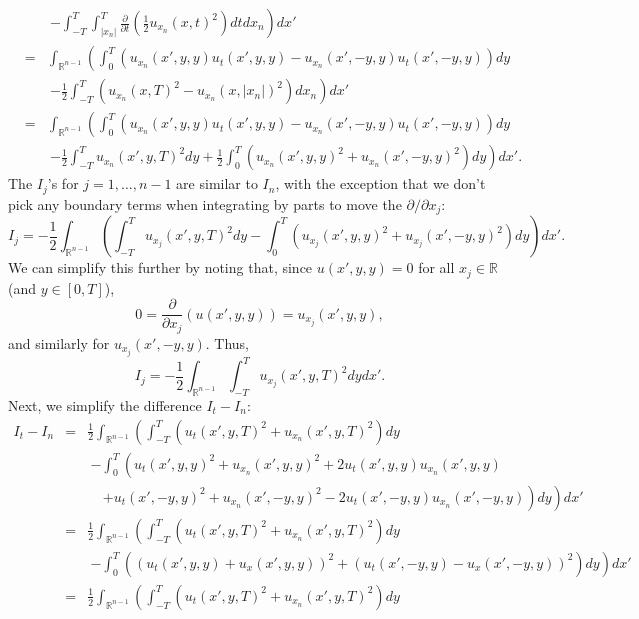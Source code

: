 \documentclass{article}
\begin{document}
\begin{enumerate}
\begin{eqnarray*}
&   & \ \left. - \int_{-T}^T \int_{|x_n|}^T \frac{\partial}{\partial t} \left( \frac{1}{2} u_{x_n}(x,t)^2 \right) dt dx_n \right) dx' \\
& = & \int_{\mathbb{R}^{n - 1}} \left( \int_0^T \left( u_{x_n}(x',y,y) u_t(x',y,y) - u_{x_n}(x',-y,y) u_t(x',-y,y) \right) dy \right. \\
&   & \ \left. - \frac{1}{2} \int_{-T}^T \left( u_{x_n}(x,T)^2 - u_{x_n}(x,|x_n|)^2 \right) dx_n \right) dx' \\
& = & \int_{\mathbb{R}^{n - 1}} \left( \int_0^T \left( u_{x_n}(x',y,y) u_t(x',y,y) - u_{x_n}(x',-y,y) u_t(x',-y,y) \right) dy \right. \\
&   & \ \left. - \frac{1}{2} \int_{-T}^T u_{x_n}(x',y,T)^2 dy + \frac{1}{2} \int_0^T \left( u_{x_n}(x',y,y)^2 + u_{x_n}(x',-y,y)^2 \right) dy \right) dx'.
\end{eqnarray*}
The \(I_j\)'s for \(j = 1, \ldots, n - 1\) are similar to \(I_n\), with the exception that we don't pick any boundary terms when integrating by parts to move the \(\partial / \partial x_j\):
\[I_j = -\frac{1}{2} \int_{\mathbb{R}^{n - 1}} \left( \int_{-T}^T u_{x_j}(x',y,T)^2 dy - \int_0^T \left( u_{x_j}(x',y,y)^2 + u_{x_j}(x',-y,y)^2 \right) dy \right) dx'.\]
We can simplify this further by noting that, since \(u(x',y,y) = 0\) for all \(x_j \in \mathbb{R}\) (and \(y \in [0,T]\)),
\[0 = \frac{\partial}{\partial x_j} \left( u(x',y,y) \right) = u_{x_j}(x',y,y),\]
and similarly for \(u_{x_j}(x',-y,y)\).  Thus,
\[I_j = -\frac{1}{2} \int_{\mathbb{R}^{n - 1}} \int_{-T}^T u_{x_j}(x',y,T)^2 dy dx'.\]
Next, we simplify the difference \(I_t - I_n\):
\begin{eqnarray*}
I_t - I_n
& = & \frac{1}{2} \int_{\mathbb{R}^{n - 1}} \left( \int_{-T}^T \left( u_t(x',y,T)^2 + u_{x_n}(x',y,T)^2 \right) dy \right. \\
&   & \ \left. - \int_0^T \left( u_t(x',y,y)^2 + u_{x_n}(x',y,y)^2 + 2 u_t(x',y,y) u_{x_n}(x',y,y) \right. \right. \\
&   & \ \ \ \ \ \left. \left. + u_t(x',-y,y)^2 + u_{x_n}(x',-y,y)^2 - 2 u_t(x',-y,y) u_{x_n}(x',-y,y) \right) dy \right) dx' \\
& = & \frac{1}{2} \int_{\mathbb{R}^{n - 1}} \left( \int_{-T}^T \left( u_t(x',y,T)^2 + u_{x_n}(x',y,T)^2 \right) dy \right. \\
&   & \ \left. - \int_0^T \left( \left( u_t(x',y,y) + u_x(x',y,y) \right)^2 + \left( u_t(x',-y,y) - u_x(x',-y,y) \right)^2 \right) dy \right) dx' \\
& = & \frac{1}{2} \int_{\mathbb{R}^{n - 1}} \left( \int_{-T}^T \left( u_t(x',y,T)^2 + u_{x_n}(x',y,T)^2 \right) dy \right. \\

\end{eqnarray*}
\end{enumerate}
\end{document}
